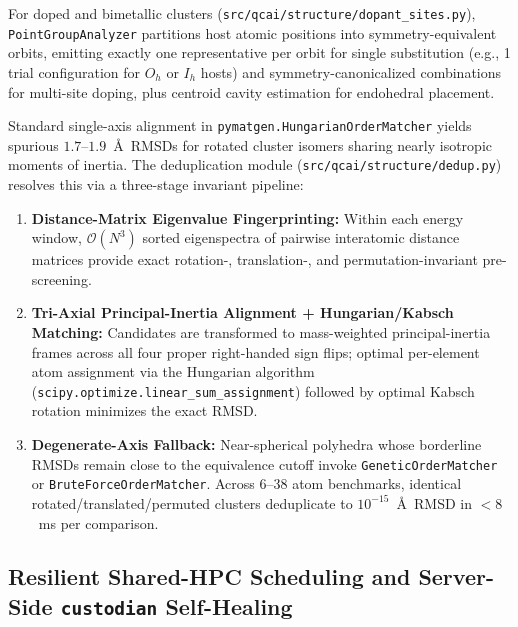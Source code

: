\documentclass[journal=jcisd8,manuscript=article]{achemso}
\begin{document}
For doped and bimetallic clusters (\texttt{src/qcai/structure/dopant\_sites.py}), \texttt{PointGroupAnalyzer}\cite{ong2013pymatgen} partitions host atomic positions into symmetry-equivalent orbits, emitting exactly one representative per orbit for single substitution (e.g., 1 trial configuration for $O_h$ or $I_h$ hosts) and symmetry-canonicalized combinations for multi-site doping, plus centroid cavity estimation for endohedral placement.

Standard single-axis alignment in \texttt{pymatgen.HungarianOrderMatcher} yields spurious $1.7\text{--}1.9$~\AA\ RMSDs for rotated cluster isomers sharing nearly isotropic moments of inertia. The deduplication module (\texttt{src/qcai/structure/dedup.py}) resolves this via a three-stage invariant pipeline:
\begin{enumerate}
  \item \textbf{Distance-Matrix Eigenvalue Fingerprinting:} Within each energy window, $\mathcal{O}(N^3)$ sorted eigenspectra of pairwise interatomic distance matrices provide exact rotation-, translation-, and permutation-invariant pre-screening.
  \item \textbf{Tri-Axial Principal-Inertia Alignment + Hungarian/Kabsch Matching:} Candidates are transformed to mass-weighted principal-inertia frames across all four proper right-handed sign flips; optimal per-element atom assignment via the Hungarian algorithm\cite{kuhn1955hungarian} (\texttt{scipy.optimize.linear\_sum\_assignment}) followed by optimal Kabsch rotation\cite{kabsch1976} minimizes the exact RMSD.
  \item \textbf{Degenerate-Axis Fallback:} Near-spherical polyhedra whose borderline RMSDs remain close to the equivalence cutoff invoke \texttt{GeneticOrderMatcher} or \texttt{BruteForceOrderMatcher}. Across 6--38 atom benchmarks, identical rotated/translated/permuted clusters deduplicate to $10^{-15}$~\AA\ RMSD in $< 8$~ms per comparison.
\end{enumerate}

\subsection{Resilient Shared-HPC Scheduling and Server-Side \texttt{custodian} Self-Healing}
\end{document}
